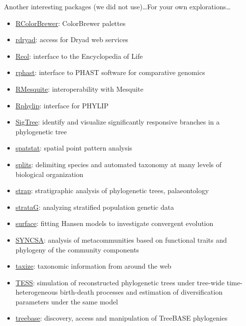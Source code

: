 \documentclass[compress, ucs, xelatex, 11pt, xcolor=svgnames,
  hyperref={
    bookmarks=true,
    unicode=true,
    colorlinks=true,
    pdftitle={Molecular data in R},
    plainpages=false,
    pdfauthor={Vojtech Zeisek},
    pdfsubject={Course about phylogeny and evolution in R},
    pdfcreator={XeLaTeX},
    pdfkeywords={R, evolution, phylogeny, molecular data},
    linkcolor=Tomato,
    anchorcolor=SaddleBrown,
    citecolor=Goldenrod,
    filecolor=DarkMagenta,
    menucolor=Sienna,
    urlcolor=DarkTurquoise,
    pdftex},
  url={hyphens, lowtilde} %
  ]{beamer}
\begin{document}
\begin{frame}[allowframebreaks]{Another interesting packages (we did not use)\ldots}{For your own explorations\ldots}
\begin{itemize}
    \item \href{https://CRAN.R-project.org/package=RColorBrewer}{RColorBrewer}: ColorBrewer palettes
    \item \href{https://CRAN.R-project.org/package=rdryad}{rdryad}: access for Dryad web services
    \item \href{https://CRAN.R-project.org/package=Reol}{Reol}: interface to the Encyclopedia of Life
    \item \href{https://CRAN.R-project.org/package=rphast}{rphast}: interface to PHAST software for comparative genomics
    \item \href{https://r-forge.r-project.org/projects/rmesquite/}{RMesquite}: interoperability with Mesquite
    \item \href{https://CRAN.R-project.org/package=Rphylip}{Rphylip}: interface for PHYLIP
    \item \href{https://CRAN.R-project.org/package=SigTree}{SigTree}: identify and visualize significantly responsive branches in a phylogenetic tree
    \item \href{https://CRAN.R-project.org/package=spatstat}{spatstat}: spatial point pattern analysis
    \item \href{https://r-forge.r-project.org/projects/splits/}{splits}: delimiting species and automated taxonomy at many levels of biological organization
    \item \href{https://CRAN.R-project.org/package=strap}{strap}: stratigraphic analysis of phylogenetic trees, palaeontology
    \item \href{https://CRAN.R-project.org/package=strataG}{strataG}: analyzing stratified population genetic data
    \item \href{https://CRAN.R-project.org/package=surface}{surface}: fitting Hansen models to investigate convergent evolution
    \item \href{https://CRAN.R-project.org/package=SYNCSA}{SYNCSA}: analysis of metacommunities based on functional traits and phylogeny of the community components
    \item \href{https://CRAN.R-project.org/package=taxize}{taxize}: taxonomic information from around the web
    \item \href{https://CRAN.R-project.org/package=TESS}{TESS}: simulation of reconstructed phylogenetic trees under tree-wide time-heterogeneous birth-death processes and estimation of diversification parameters under the same model
    \item \href{https://CRAN.R-project.org/package=treebase}{treebase}:  discovery, access and manipulation of TreeBASE phylogenies

\end{itemize}
\end{frame}
\end{document}
